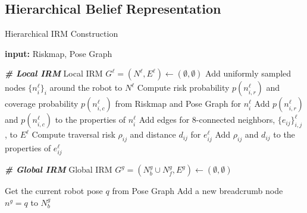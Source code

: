 \documentclass[letterpaper]{article} %
\begin{document}
\subsection{Hierarchical Belief Representation} \label{ssec:belief-managers}

\begin{algorithm}[t!]
{\fontsize{8.5pt}{9.8pt}\selectfont
\caption{Hierarchical IRM Construction}
\label{alg:IRMs}
\begin{algorithmic}
  \STATE \textbf{input:} Riskmap, Pose Graph %

  \vspace{3pt}
  \STATE \textbf{\textit{\# Local IRM}}
  \STATE Local IRM $G^\ell = (N^\ell, E^\ell) \gets (\emptyset, \emptyset)$
  \STATE Add uniformly sampled nodes $\{n^\ell_i\}_i$ around the robot to $N^\ell$
    \STATE Compute risk probability $p(n^\ell_{i,r})$ and coverage probability $p(n^\ell_{i,c})$ from Riskmap and Pose Graph for $n^\ell_i$
    \STATE Add $p(n^\ell_{i,r})$ and $p(n^\ell_{i,c})$ to the properties of $n^\ell_i$
  \ENDFOR
  \STATE Add edges for 8-connected neighbors, $\{e_{ij}\}^\ell_{i,j}$, to $E^\ell$
    \STATE Compute traversal risk $\rho_{ij}$ and distance $d_{ij}$ for $e^\ell_{ij}$
    \STATE Add $\rho_{ij}$ and $d_{ij}$ to the properties of $e^\ell_{ij}$
  \ENDFOR

  \vspace{3pt}
  \STATE \textbf{\textit{\# Global IRM}}
    \STATE Global IRM $G^g = (N^g_b \cup N^g_f, E^g) \gets (\emptyset, \emptyset)$
  \ENDIF
  
  \STATE Get the current robot pose $q$ from Pose Graph
    \STATE Add a new breadcrumb node $n^g = q$ to $N^g_b$
  \ENDIF



\end{algorithmic}}
\end{algorithm}
\end{document}

